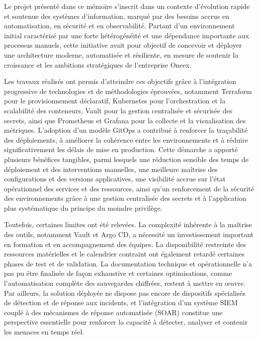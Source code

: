 Le projet présenté dans ce mémoire s’inscrit dans un contexte d’évolution rapide et soutenue des systèmes d’information, marqué par des besoins accrus en automatisation, en sécurité et en observabilité. Partant d’un environnement initial caractérisé par une forte hétérogénéité et une dépendance importante aux processus manuels, cette initiative avait pour objectif de concevoir et déployer une architecture moderne, automatisée et résiliente, en mesure de soutenir la croissance et les ambitions stratégiques de l’entreprise Oneex.

Les travaux réalisés ont permis d’atteindre ces objectifs grâce à l’intégration progressive de technologies et de méthodologies éprouvées, notamment Terraform pour le provisionnement déclaratif, Kubernetes pour l’orchestration et la scalabilité des conteneurs, Vault pour la gestion centralisée et sécurisée des secrets, ainsi que Prometheus et Grafana pour la collecte et la visualisation des métriques. L’adoption d’un modèle GitOps a contribué à renforcer la traçabilité des déploiements, à améliorer la cohérence entre les environnements et à réduire significativement les délais de mise en production. Cette démarche a apporté plusieurs bénéfices tangibles, parmi lesquels une réduction sensible des temps de déploiement et des interventions manuelles, une meilleure maîtrise des configurations et des versions applicatives, une visibilité accrue sur l’état opérationnel des services et des ressources, ainsi qu’un renforcement de la sécurité des environnements grâce à une gestion centralisée des secrets et à l’application plus systématique du principe du moindre privilège.

Toutefois, certaines limites ont été relevées. La complexité inhérente à la maîtrise des outils, notamment Vault et Argo CD, a nécessité un investissement important en formation et en accompagnement des équipes. La disponibilité restreinte des ressources matérielles et le calendrier contraint ont également retardé certaines phases de test et de validation. La documentation technique et opérationnelle n’a pas pu être finalisée de façon exhaustive et certaines optimisations, comme l’automatisation complète des sauvegardes chiffrées, restent à mettre en œuvre. Par ailleurs, la solution déployée ne dispose pas encore de dispositifs spécialisés de détection et de réponse aux incidents, et l’intégration d’un système SIEM couplé à des mécanismes de réponse automatisée (SOAR) constitue une perspective essentielle pour renforcer la capacité à détecter, analyser et contenir les menaces en temps réel.

